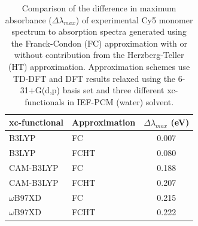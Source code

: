 \begin{table}[h]
\centering
\caption[Comparison of the difference in maximum absorbance ($\Delta\lambda_{max}$) of experimental Cy5 monomer spectrum to absorption spectra generated using the Franck-Condon (FC) approximation with or without contribution from the Herzberg-Teller (HT) approximation. Approximation schemes use TD-DFT and DFT results relaxed using the 6-31+G(d,p) basis set and three different xc-functionals in IEF-PCM (water) solvent.]{Comparison of the difference in maximum absorbance ($\Delta\lambda_{max}$) of experimental Cy5 monomer spectrum \cite{Cannon2017} to absorption spectra generated using the Franck-Condon (FC) approximation with or without contribution from the Herzberg-Teller (HT) approximation. Approximation schemes use TD-DFT and DFT results relaxed using the 6-31+G(d,p) basis set and three different xc-functionals in IEF-PCM (water) solvent.} \label{tab:max-abs}
\begin{tabular}{llc}
\hline
xc-functional & Approximation & $\Delta\lambda_{max}$ (eV) \\ \hline
B3LYP & FC & 0.007 \\ 
B3LYP & FCHT & 0.080 \\ 
CAM-B3LYP & FC & 0.188 \\ 
CAM-B3LYP & FCHT & 0.207 \\ 
$\omega$B97XD & FC & 0.215 \\
$\omega$B97XD & FCHT & 0.222 \\ 
\end{tabular}
\end{table}

